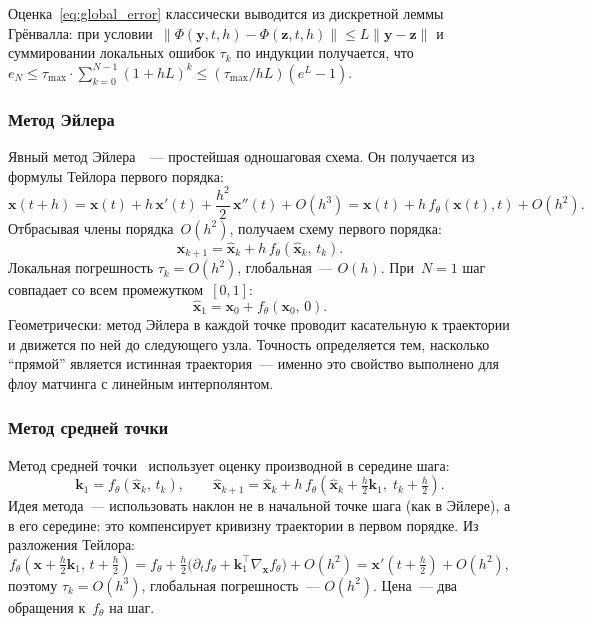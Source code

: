 Оценка~\eqref{eq:global_error} классически выводится из дискретной леммы Грёнвалла: при условии~$\lVert\Phi(\mathbf{y},t,h)-\Phi(\mathbf{z},t,h)\rVert\le L\lVert\mathbf{y}-\mathbf{z}\rVert$ и суммировании локальных ошибок $\tau_k$ по индукции получается, что~$e_N \le \tau_{\max}\cdot\sum_{k=0}^{N-1}(1+hL)^k \le (\tau_{\max}/hL)(e^L-1)$.

\subsubsection{Метод Эйлера}

Явный метод Эйлера~\cite{euler1769institutionum}~--- простейшая одношаговая схема. Он получается из формулы Тейлора первого порядка:
\[
    \mathbf{x}(t+h) = \mathbf{x}(t) + h\,\mathbf{x}'(t) + \frac{h^2}{2}\,\mathbf{x}''(t) + O(h^3) = \mathbf{x}(t) + h\,f_\theta(\mathbf{x}(t), t) + O(h^2).
\]
Отбрасывая члены порядка~$O(h^2)$, получаем схему первого порядка:
\begin{equation}
    \hat{\mathbf{x}}_{k+1} = \hat{\mathbf{x}}_k + h\, f_\theta(\hat{\mathbf{x}}_k,\, t_k).
    \label{eq:euler}
\end{equation}
Локальная погрешность $\tau_k = O(h^2)$, глобальная~--- $O(h)$. При~$N=1$ шаг совпадает со всем промежутком~$[0,1]$:
\[
    \hat{\mathbf{x}}_1 = \mathbf{x}_0 + f_\theta(\mathbf{x}_0,\, 0).
\]
Геометрически: метод Эйлера в каждой точке проводит касательную к траектории и движется по ней до следующего узла. Точность определяется тем, насколько ``прямой'' является истинная траектория~--- именно это свойство выполнено для флоу матчинга с линейным интерполянтом.

\subsubsection{Метод средней точки}

Метод средней точки~\cite{10.1145/320831.320840} использует оценку производной в середине шага:
\begin{equation}
    \mathbf{k}_1 = f_\theta(\hat{\mathbf{x}}_k,\, t_k),
    \qquad
    \hat{\mathbf{x}}_{k+1} = \hat{\mathbf{x}}_k + h\,f_\theta\!\left(\hat{\mathbf{x}}_k + \tfrac{h}{2}\mathbf{k}_1,\; t_k + \tfrac{h}{2}\right).
    \label{eq:midpoint}
\end{equation}
Идея метода~--- использовать наклон не в начальной точке шага (как в Эйлере), а в его середине: это компенсирует кривизну траектории в первом порядке. Из разложения Тейлора:
\[
    f_\theta\!\left(\mathbf{x} + \tfrac{h}{2}\mathbf{k}_1,\, t + \tfrac{h}{2}\right)
    = f_\theta + \tfrac{h}{2}\bigl(\partial_t f_\theta + \mathbf{k}_1^\top \nabla_{\mathbf{x}} f_\theta\bigr) + O(h^2)
    = \mathbf{x}'(t+\tfrac{h}{2}) + O(h^2),
\]
поэтому $\tau_k = O(h^3)$, глобальная погрешность~--- $O(h^2)$. Цена~--- два обращения к~$f_\theta$ на шаг.

